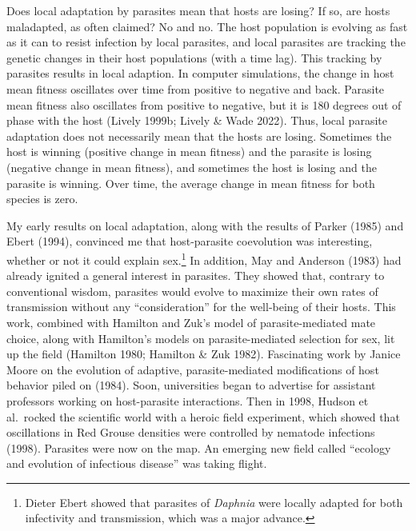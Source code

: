 \documentclass[
  letterpaper,
]{book}
\begin{document}
Does local adaptation by parasites mean that hosts are losing? If so,
are hosts maladapted, as often claimed? No and no. The host population
is evolving as fast as it can to resist infection by local parasites,
and local parasites are tracking the genetic changes in their host
populations (with a time lag). This tracking by parasites results in
local adaption. In computer simulations, the change in host mean fitness
oscillates over time from positive to negative and back. Parasite mean
fitness also oscillates from positive to negative, but it is 180 degrees
out of phase with the host (Lively 1999b; Lively \& Wade 2022). Thus,
local parasite adaptation does not necessarily mean that the hosts are
losing. Sometimes the host is winning (positive change in mean fitness)
and the parasite is losing (negative change in mean fitness), and
sometimes the host is losing and the parasite is winning. Over time, the
average change in mean fitness for both species is zero.

My early results on local adaptation, along with the results of Parker
(1985) and Ebert (1994), convinced me that host-parasite coevolution was
interesting, whether or not it could explain sex.\footnote{Dieter Ebert
  showed that parasites of \emph{Daphnia} were locally adapted for both
  infectivity and transmission, which was a major advance.} In addition,
May and Anderson (1983) had already ignited a general interest in
parasites. They showed that, contrary to conventional wisdom, parasites
would evolve to maximize their own rates of transmission without any
``consideration'' for the well-being of their hosts. This work, combined
with Hamilton and Zuk's model of parasite-mediated mate choice, along
with Hamilton's models on parasite-mediated selection for sex, lit up
the field (Hamilton 1980; Hamilton \& Zuk 1982). Fascinating work by
Janice Moore on the evolution of adaptive, parasite-mediated
modifications of host behavior piled on (1984). Soon, universities began
to advertise for assistant professors working on host-parasite
interactions. Then in 1998, Hudson et al.~rocked the scientific world
with a heroic field experiment, which showed that oscillations in Red
Grouse densities were controlled by nematode infections (1998).
Parasites were now on the map. An emerging new field called ``ecology
and evolution of infectious disease'' was taking flight.
\end{document}
